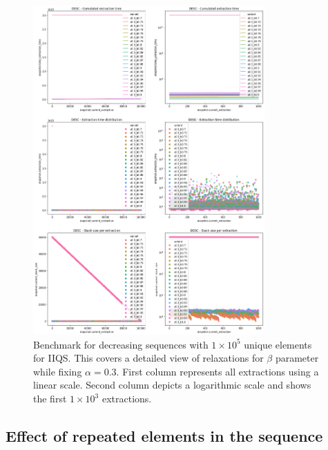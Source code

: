 \begin{figure}[!ht]
    \centering
    \includegraphics[width=0.79\textwidth]{./fragments/04_experimental_execution/images/04_alphabeta_detail_decreasing_right.png}
    \caption{Benchmark for decreasing sequences with $1\times10^5$ unique elements for IIQS. This covers a detailed view of relaxations for $\beta$ parameter while fixing $\alpha=0.3$.  First column represents all extractions using a linear scale. Second column depicts a logarithmic scale and shows the first $1\times10^3$ extractions. }
    \label{FIG:05_ALPHABETA_BENCHMARK_DESC_RIGHT}
\end{figure}

\subsection{Effect of repeated elements in the sequence}


